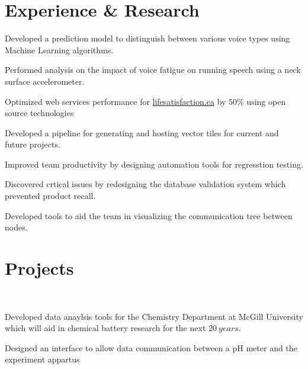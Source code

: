 \documentclass[]{sumbal-resume}
\begin{document}
\begin{minipage}[t]{0.66\textwidth}
	
	\section{Experience \& Research}

	\vspace{\topsep}
	\begin{tightemize}
		\item Developed a prediction model to distinguish between various voice types using Machine Learning algorithms.  
		\item Performed analysis on the impact of voice fatigue on running speech using a neck surface accelerometer.
	\end{tightemize}

	\begin{tightemize}
		\item Optimized web services performance for \href{http://lifesatisfaction.ca}{lifesatisfaction.ca} by $50 \%$ using open source technologies
		\item Developed a pipeline for generating and hosting vector tiles for current and future projects.
	\end{tightemize}

	\begin{tightemize}
		\item Improved team productivity by designing automation tools for regresstion testing.  
		\item Discovered crtical issues by redesigning the database validation system which prevented product recall.
		\item Developed tools to aid the team in visualizing the communication tree between nodes.
	\end{tightemize}

	\sectionsep
	\section{Projects}

	 \\
	\begin{tightemize}
		\item Developed data anaylsis tools for the Chemistry Department at McGill University which will aid in chemical battery research for the next $20 \ years$. 
  		\item Designed an interface to allow data communication between a pH meter and the experiment appartus 
	\end{tightemize}


\end{minipage}
\end{document}
